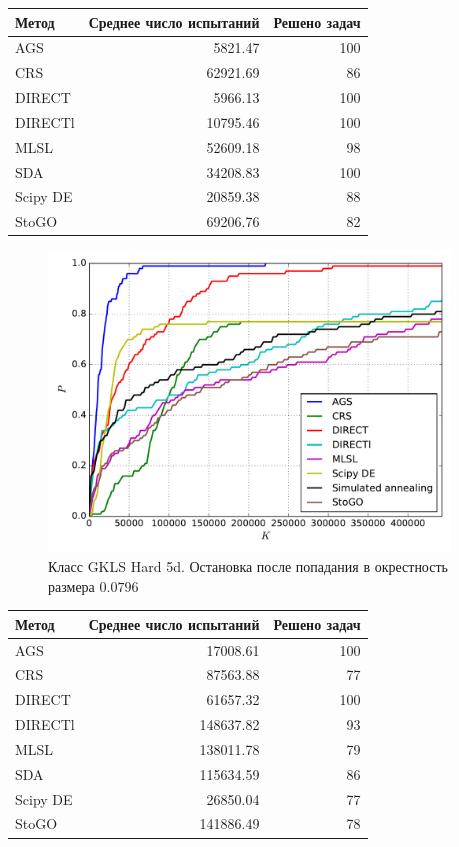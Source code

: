 \documentclass[a4paper]{article}
\begin{document}
\begin{tabular}{lrr}
\hline
 Метод    &   Среднее число испытаний &   Решено задач \\
\hline
 AGS      &                   5821.47 &            100 \\
 CRS      &                  62921.69 &             86 \\
 DIRECT   &                   5966.13 &            100 \\
 DIRECTl  &                  10795.46 &            100 \\
 MLSL     &                  52609.18 &             98 \\
 SDA      &                  34208.83 &            100 \\
 Scipy DE &                  20859.38 &             88 \\
 StoGO    &                  69206.76 &             82 \\
\hline
\end{tabular}
\begin{figure}[H]
  \center
  \includegraphics[width=0.95\textwidth]{../experiments/gklsh5d_serg/cmc.pdf}
  \caption{Класс GKLS Hard 5d. Остановка после попадания в окрестность размера $0.0796$}
  \label{fig:}
\end{figure}

\begin{tabular}{lrr}
\hline
 Метод    &   Среднее число испытаний &   Решено задач \\
\hline
 AGS      &                  17008.61 &            100 \\
 CRS      &                  87563.88 &             77 \\
 DIRECT   &                  61657.32 &            100 \\
 DIRECTl  &                 148637.82 &             93 \\
 MLSL     &                 138011.78 &             79 \\
 SDA      &                 115634.59 &             86 \\
 Scipy DE &                  26850.04 &             77 \\
 StoGO    &                 141886.49 &             78 \\
\hline
\end{tabular}
\end{document}

